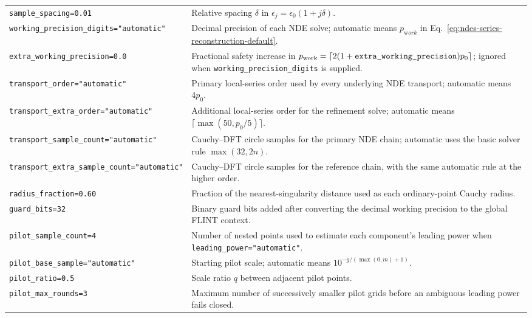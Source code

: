 \documentclass[11pt]{article}
\newcommand{\eps}{\epsilon}
\begin{document}
\begin{longtable}{L{0.36\textwidth}L{0.58\textwidth}}
\texttt{sample\_spacing=0.01} & Relative spacing $\delta$ in
$\eps_j=\eps_0(1+j\delta)$. \\
\texttt{working\_precision\_}\newline\texttt{digits="automatic"} & Decimal precision of each NDE solve;
automatic means $p_{\mathrm work}$ in
Eq.~\eqref{eq:ndes-series-reconstruction-default}. \\
\texttt{extra\_working\_precision=0.0} & Fractional safety increase in
$p_{\rm work}=\lceil2(1+\texttt{extra\_working\_precision})p_0\rceil$; ignored when
\texttt{working\_precision\_digits} is supplied. \\
\texttt{transport\_order="automatic"} & Primary local-series order used by every underlying
NDE transport; automatic means $4p_0$. \\
\texttt{transport\_extra\_}\newline\texttt{order="automatic"} & Additional local-series order for the
refinement solve; automatic means $\lceil\max(50,p_0/5)\rceil$. \\
\texttt{transport\_sample\_}\newline\texttt{count="automatic"} & Cauchy--DFT circle samples
for the primary NDE chain; automatic uses the basic solver rule $\max(32,2n)$. \\
\texttt{transport\_extra\_}\newline\texttt{sample\_count="automatic"} & Cauchy--DFT circle
samples for the reference chain, with the same automatic rule at the higher order. \\
\texttt{radius\_fraction=0.60} & Fraction of the nearest-singularity distance used as each
ordinary-point Cauchy radius. \\
\texttt{guard\_bits=32} & Binary guard bits added after converting the decimal working
precision to the global FLINT context. \\
\texttt{pilot\_sample\_count=4} & Number of nested points used to estimate each component's
leading power when \texttt{leading\_power="automatic"}. \\
\texttt{pilot\_base\_sample=}\newline\texttt{"automatic"} & Starting pilot scale;
automatic means $10^{-g/(\max(0,m)+1)}$. \\
\texttt{pilot\_ratio=0.5} & Scale ratio $q$ between adjacent pilot points. \\
\texttt{pilot\_max\_rounds=3} & Maximum number of successively smaller pilot grids before an
ambiguous leading power fails closed. \\

\end{longtable}
\end{document}
